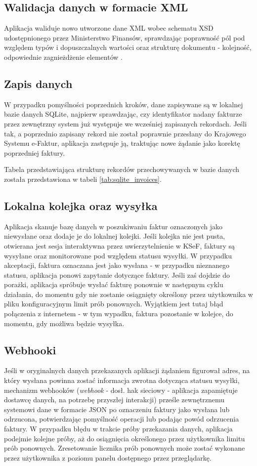 \subsection{Walidacja danych w formacie XML}
Aplikacja waliduje nowo utworzone dane XML wobec schematu XSD udostępnionego przez Ministerstwo Finansów, sprawdzając poprawność pól pod względem typów i dopuszczalnych wartości oraz strukturę dokumentu - kolejność, odpowiednie zagnieżdżenie elementów \parencite{structured_invoice_2025}.

\subsection{Zapis danych}
W przypadku pomyślności poprzednich kroków, dane zapisywane są w lokalnej bazie danych SQLite, najpierw sprawdzając, czy identyfikator nadany fakturze przez zewnętrzny system już występuje we wcześniej zapisanych rekordach. Jeśli tak, a poprzednio zapisany rekord nie został poprawnie przesłany do Krajowego Systemu e-Faktur, aplikacja zastępuje ją, traktując nowe żądanie jako korektę poprzedniej faktury.

Tabela przedstawiająca strukturę rekordów przechowywanych w bazie danych została przedstawiona w tabeli \ref{tab:sqlite_invoices}.

\subsection{Lokalna kolejka oraz wysyłka}
Aplikacja skanuje bazę danych w poszukiwaniu faktur oznaczonych jako niewysłane oraz dodaje je do lokalnej kolejki. Jeśli kolejka nie jest pusta, otwierana jest sesja interaktywna przez uwierzytelnienie w KSeF, faktury są wysyłane oraz monitorowane pod względem statusu wysyłki. W przypadku akceptacji, faktura oznaczana jest jako wysłana - w przypadku nieznanego statusu, aplikacja ponowi zapytanie dotyczące faktury. Jeśli zaś dojdzie do porażki, aplikacja spróbuje wysłać fakturę ponownie w następnym cyklu działania, do momentu gdy nie zostanie osiągnięty określony przez użytkownika w pliku konfiguracyjnym limit prób ponownych. Wyjątkiem jest tutaj błąd połączenia z internetem - w tym wypadku, faktura pozostanie w kolejce, do momentu, gdy możliwa będzie wysyłka.

\subsection{Webhooki}
Jeśli w oryginalnych danych przekazanych aplikacji żądaniem figurował adres, na który wysłana powinna zostać informacja zwrotna dotycząca statusu wysyłki, mechanizm webhooków (\textit{webhook} - dosł. hak sieciowy - aplikacja zapamiętuje dostawcę danych, na potrzebę przyszłej interakcji) \parencite{redhat_webhooks}
prześle zewnętrznemu systemowi dane w formacie JSON po oznaczeniu faktury jako wysłana lub odrzucona, potwierdzając pomyślność operacji lub podając powód odrzucenia faktury. W przypadku błędu w trakcie próby przekazania danych, aplikacja podejmie kolejne próby, aż do osiągnięcia określonego przez użytkownika limitu prób ponownych. Zresetowanie licznika prób ponownych może zostać wykonane przez użytkownika z poziomu panelu dostępnego przez przeglądarkę.

